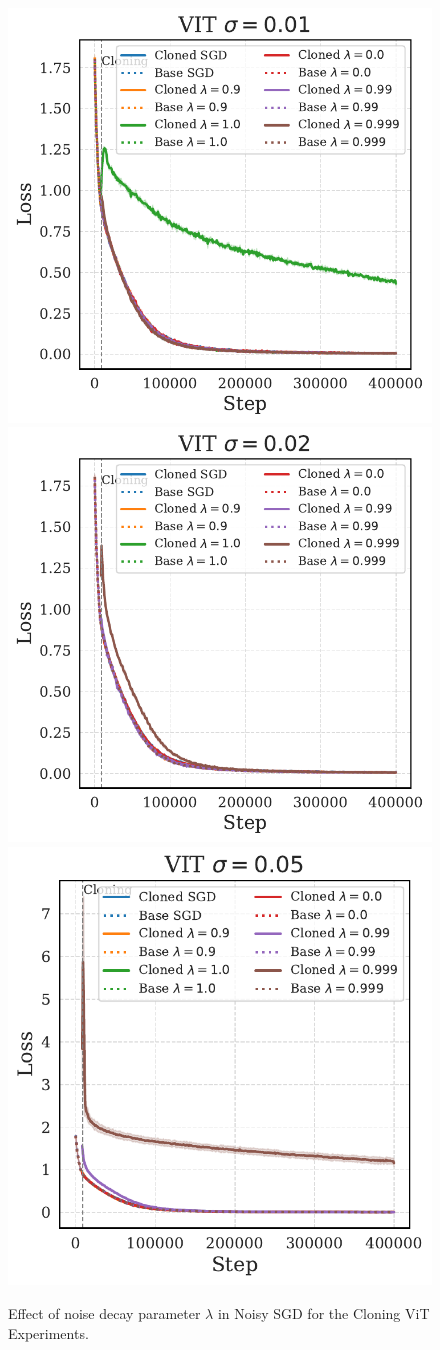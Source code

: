 \documentclass{article}
\numberwithin{figure}{section}
\begin{document}
\begin{figure}
    \centering
    \includegraphics[width=0.3\linewidth]{paper/images/vit_noises_cloning_losses_plot_lamda_sigma_0.01.pdf}
    \includegraphics[width=0.3\linewidth]{paper/images/vit_noises_cloning_losses_plot_lamda_sigma_0.02.pdf}
    \includegraphics[width=0.3\linewidth]{paper/images/vit_noises_cloning_losses_plot_lamda_sigma_0.05.pdf}
    \caption{Effect of noise decay parameter $\lambda$ in Noisy SGD for the Cloning ViT Experiments.}
    \label{fig:enter-label}
\end{figure}
\end{document}
